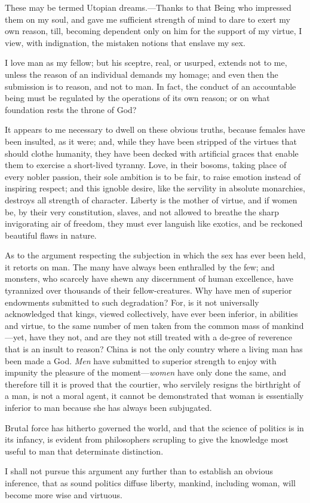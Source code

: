 These may be termed Utopian dreams.---Thanks to that Being who
impressed them on my soul, and gave me sufficient strength of mind to
dare to exert my own reason, till, becoming dependent only on him for
the support of my virtue, I view, with indignation, the mistaken
notions that enslave my sex.

I love man as my fellow; but his sceptre, real, or usurped, extends
not to me, unless the reason of an individual demands my homage; and
even then the submission is to reason, and not to man. In fact, the
conduct of an accountable being must be regulated by the operations of
its own reason; or on what foundation rests the throne of God?

It appears to me necessary to dwell on these obvious truths, because
females have been insulted, as it were; and, while they have been
stripped of the virtues that should clothe  humanity, they
have been decked with artificial graces that enable them to exercise a
short-lived tyranny. Love, in their bosoms, taking place of every
nobler passion, their sole ambition is to be fair, to raise emotion
instead of inspiring respect; and this ignoble desire, like the
servility in absolute monarchies, destroys all strength of character.
Liberty is the mother of virtue, and if women be, by their very
constitution, slaves, and not allowed to breathe the sharp
invigorating air of freedom, they must ever languish like exotics, and
be reckoned beautiful flaws in nature.

As to the argument respecting the subjection in which the sex has ever
been held, it retorts on man. The many have always been enthralled by
the few; and monsters, who scarcely have shewn any discernment of
human excellence, have tyrannized over thousands of their
fellow-creatures. Why have men of superior endowments submitted to
such degradation? For, is it not universally acknowledged that kings,
viewed collectively, have ever been inferior, in abilities and virtue,
to the same number of men taken from the common mass of mankind---yet,
have they not, and are they not still treated with a de-gree
of reverence that is an insult to reason? China is not the only
country where a living man has been made a God. \textit{Men} have
submitted to superior strength to enjoy with impunity the pleasure of
the mo\-ment---\textit{women} have only done the same, and therefore
till it is proved that the courtier, who servilely resigns the
birthright of a man, is not a moral agent, it cannot be demonstrated
that woman is essentially inferior to man because she has always been
subjugated.

Brutal force has hitherto governed the world, and that the science of
politics is in its infancy, is evident from philosophers scrupling to
give the knowledge most useful to man that determinate distinction.

I shall not pursue this argument any further than to establish an
obvious inference, that as sound politics diffuse liberty, mankind,
including woman, will become more wise and virtuous.

